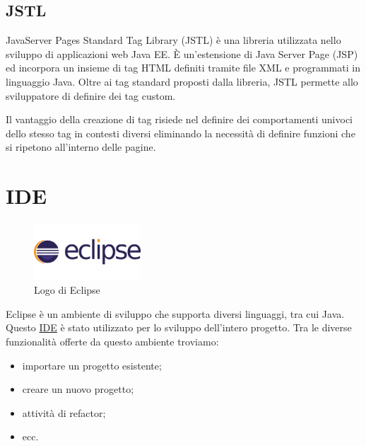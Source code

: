 \subsection{JSTL}
\noindent JavaServer Pages Standard Tag Library (JSTL) è una libreria utilizzata nello sviluppo di applicazioni web Java EE. È un'estensione di Java Server Page (JSP) ed incorpora un insieme di tag HTML definiti tramite file XML e programmati in linguaggio Java. Oltre ai tag standard proposti dalla libreria, JSTL permette allo sviluppatore di definire dei tag custom. 

\setlength{\parskip}{3ex}

\noindent Il vantaggio della creazione di tag risiede nel definire dei comportamenti univoci dello stesso tag in contesti diversi eliminando la necessità di definire funzioni che si ripetono all'interno delle pagine.

\pagebreak

\section{IDE}

\begin{figure}[!h]
	\centering
	\includegraphics[width=4cm]{../images/Eclipse-logo.png}
	\caption{Logo di Eclipse}
\end{figure}

\noindent Eclipse è un ambiente di sviluppo che supporta diversi linguaggi, tra cui Java. Questo {\hyperref[sec:ide-definition]{IDE}}\glsfirstoccur \; è stato utilizzato per lo sviluppo dell'intero progetto.
Tra le diverse funzionalità offerte da questo ambiente troviamo:
\begin{itemize}
\item importare un progetto esistente;
\item creare un nuovo progetto;
\item attività di refactor;
\item ecc.
\end{itemize}